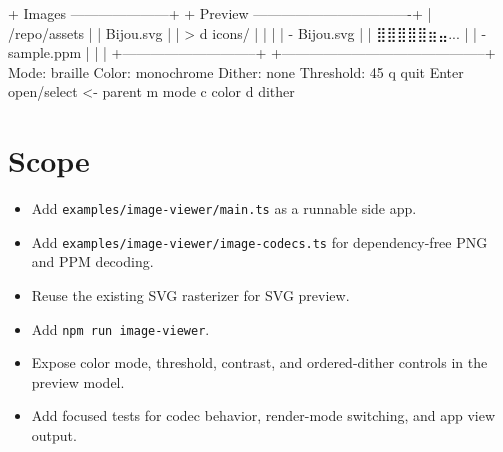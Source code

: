\begin{CodeBlock}
+ Images ---------------------+ + Preview ----------------------------------+
| /repo/assets                | | Bijou.svg                                  |
| > d icons/                  | |                                            |
|   - Bijou.svg               | |   ⣿⣿⣿⣿⣿⣶⣤...                    |
|   - sample.ppm              | |                                            |
+-----------------------------+ +--------------------------------------------+
Mode: braille  Color: monochrome  Dither: none  Threshold: 45%
q quit  Enter open/select  <- parent  m mode  c color  d dither
\end{CodeBlock}

\section{Scope}\label{record-137-scope}

\begin{itemize}
\tightlist
\item
  Add \texttt{e\allowbreak{}x\allowbreak{}a\allowbreak{}m\allowbreak{}p\allowbreak{}l\allowbreak{}e\allowbreak{}s\allowbreak{}/\allowbreak{}i\allowbreak{}m\allowbreak{}a\allowbreak{}g\allowbreak{}e\allowbreak{}-\allowbreak{}v\allowbreak{}i\allowbreak{}e\allowbreak{}w\allowbreak{}e\allowbreak{}r\allowbreak{}/\allowbreak{}m\allowbreak{}a\allowbreak{}i\allowbreak{}n\allowbreak{}.\allowbreak{}t\allowbreak{}s} as a runnable side app.
\item
  Add \texttt{e\allowbreak{}x\allowbreak{}a\allowbreak{}m\allowbreak{}p\allowbreak{}l\allowbreak{}e\allowbreak{}s\allowbreak{}/\allowbreak{}i\allowbreak{}m\allowbreak{}a\allowbreak{}g\allowbreak{}e\allowbreak{}-\allowbreak{}v\allowbreak{}i\allowbreak{}e\allowbreak{}w\allowbreak{}e\allowbreak{}r\allowbreak{}/\allowbreak{}i\allowbreak{}m\allowbreak{}a\allowbreak{}g\allowbreak{}e\allowbreak{}-\allowbreak{}c\allowbreak{}o\allowbreak{}d\allowbreak{}e\allowbreak{}c\allowbreak{}s\allowbreak{}.\allowbreak{}t\allowbreak{}s} for dependency-free PNG and PPM decoding.
\item
  Reuse the existing SVG rasterizer for SVG preview.
\item
  Add \texttt{n\allowbreak{}p\allowbreak{}m\allowbreak{} \allowbreak{}r\allowbreak{}u\allowbreak{}n\allowbreak{} \allowbreak{}i\allowbreak{}m\allowbreak{}a\allowbreak{}g\allowbreak{}e\allowbreak{}-\allowbreak{}v\allowbreak{}i\allowbreak{}e\allowbreak{}w\allowbreak{}e\allowbreak{}r}.
\item
  Expose color mode, threshold, contrast, and ordered-dither controls in the preview model.
\item
  Add focused tests for codec behavior, render-mode switching, and app view output.
\end{itemize}

